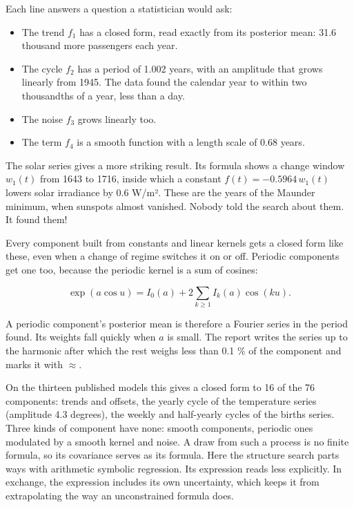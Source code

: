 \documentclass[
]{article}
\providecommand{\tightlist}{%
  \setlength{\itemsep}{0pt}\setlength{\parskip}{0pt}}
\begin{document}
Each line answers a question a statistician would ask:

\begin{itemize}
\tightlist
\item
  The trend \(f_1\) has a closed form, read exactly from its posterior
  mean: 31.6 thousand more passengers each year.
\item
  The cycle \(f_2\) has a period of 1.002 years, with an amplitude that
  grows linearly from 1945. The data found the calendar year to within
  two thousandths of a year, less than a day.
\item
  The noise \(f_3\) grows linearly too.
\item
  The term \(f_4\) is a smooth function with a length scale of 0.68
  years.
\end{itemize}

The solar series gives a more striking result. Its formula shows a
change window \(w_1(t)\) from 1643 to 1716, inside which a constant
\(f(t) = -0.5964\,w_1(t)\) lowers solar irradiance by 0.6 W/m². These
are the years of the Maunder minimum, when sunspots almost vanished.
Nobody told the search about them. It found them!

Every component built from constants and linear kernels gets a closed
form like these, even when a change of regime switches it on or off.
Periodic components get one too, because the periodic kernel is a sum of
cosines:

\[\exp(a\cos u) = I_0(a) + 2\sum_{k \ge 1} I_k(a)\cos(k u).\]

A periodic component's posterior mean is therefore a Fourier series in
the period found. Its weights fall quickly when \(a\) is small. The
report writes the series up to the harmonic after which the rest weighs
less than 0.1 \% of the component and marks it with \(\approx\).

On the thirteen published models this gives a closed form to 16 of the
76 components: trends and offsets, the yearly cycle of the temperature
series (amplitude 4.3 degrees), the weekly and half-yearly cycles of the
births series. Three kinds of component have none: smooth components,
periodic ones modulated by a smooth kernel and noise. A draw from such a
process is no finite formula, so its covariance serves as its formula.
Here the structure search parts ways with arithmetic symbolic
regression. Its expression reads less explicitly. In exchange, the
expression includes its own uncertainty, which keeps it from
extrapolating the way an unconstrained formula does.
\end{document}
